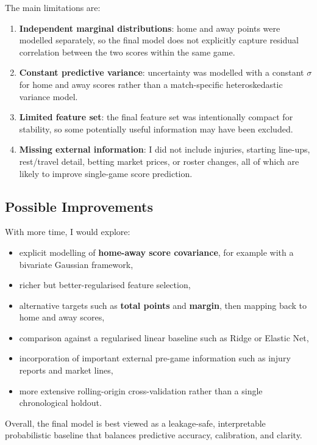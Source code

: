 \documentclass{article}
\begin{document}
The main limitations are:
\begin{enumerate}
    \item \textbf{Independent marginal distributions}: home and away points were modelled separately, so the final model does not explicitly capture residual correlation between the two scores within the same game.
    \item \textbf{Constant predictive variance}: uncertainty was modelled with a constant $\sigma$ for home and away scores rather than a match-specific heteroskedastic variance model.
    \item \textbf{Limited feature set}: the final feature set was intentionally compact for stability, so some potentially useful information may have been excluded.
    \item \textbf{Missing external information}: I did not include injuries, starting line-ups, rest/travel detail, betting market prices, or roster changes, all of which are likely to improve single-game score prediction.
\end{enumerate}

\subsection{Possible Improvements}

With more time, I would explore:
\begin{itemize}
    \item explicit modelling of \textbf{home-away score covariance}, for example with a bivariate Gaussian framework,
    \item richer but better-regularised feature selection,
    \item alternative targets such as \textbf{total points} and \textbf{margin}, then mapping back to home and away scores,
    \item comparison against a regularised linear baseline such as Ridge or Elastic Net,
    \item incorporation of important external pre-game information such as injury reports and market lines,
    \item more extensive rolling-origin cross-validation rather than a single chronological holdout.
\end{itemize}

Overall, the final model is best viewed as a leakage-safe, interpretable probabilistic baseline that balances predictive accuracy, calibration, and clarity.
\end{document}
